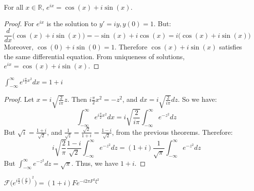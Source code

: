 \documentclass[crop=false,class=book,oneside]{standalone}
\begin{document}
            \begin{theorem}
            For all $x\in \mathbb{R}$, $e^{ix} = \cos(x)+i\sin(x)$.
            \end{theorem}
            \begin{proof}
            For $e^{ix}$ is the solution to $y' = iy, y(0) = 1$. But:
            \begin{equation*}
                \frac{d}{dx}\big(\cos(x)+i\sin(x)\big) = -\sin(x)+i\cos(x) = i\big(\cos(x)+i\sin(x)\big)
            \end{equation*}
            Moreover, $\cos(0)+i\sin(0) = 1$. Therefore $\cos(x)+i\sin(x)$ satisfies the same differential equation. From uniqueness of solutions, $e^{ix} = \cos(x)+i\sin(x)$.
            \end{proof}
            \begin{theorem}
            $\int_{-\infty}^{\infty} e^{i\frac{\pi}{2}x^2}dx = 1+i$
            \end{theorem}
            \begin{proof}
            Let $x = i\sqrt{\frac{2}{i\pi}}z$. Then $i\frac{\pi}{2}x^2 = -z^2$, and $dx = i\sqrt{\frac{2}{i\pi}}dz$. So we have:
            \begin{equation*}
                \int_{-\infty}^{\infty}e^{i\frac{\pi}{2}x^2}dx = i\sqrt{\frac{2}{i\pi}}\int_{-\infty}^{\infty} e^{-z^2}dz    
            \end{equation*}
            But $\sqrt{i} = \frac{1+i}{\sqrt{2}}$, and $\frac{1}{\sqrt{i}} = \frac{\sqrt{2}}{1+i} = \frac{1-i}{\sqrt{2}}$, from the previous theorems. Therefore:
            \begin{equation*}
                i\sqrt{\frac{2}{\pi}}\frac{1-i}{\sqrt{2}}\int_{-\infty}^{\infty}e^{-z^2}dz = (1+i)\frac{1}{\sqrt{\pi}}\int_{-\infty}^{\infty}e^{-z^2}dz
            \end{equation*}
            But $\int_{-\infty}^{\infty}e^{-z^2}dz = \sqrt{\pi}$. Thus, we have $1+i$.
            \end{proof}
            \begin{theorem}
            $\mathcal{F}\big(e^{i\frac{\pi}{2}(\frac{\rho}{F})^2}\big) = (1+i)Fe^{-i2\pi F^2 \xi^2}$
            \end{theorem}
\end{document}
